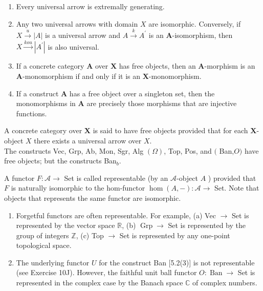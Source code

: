\begin{prop}
    \begin{enumerate}
        \item Every universal arrow is extremally generating.
        \item Any two universal arrows with domain $X$ are isomorphic. Conversely, if $X \xrightarrow{u}|A|$ is a universal arrow and $A \xrightarrow{k} A^{\prime}$ is an $\mathbf{A}$-isomorphism, then $X \xrightarrow{k o u}\left|A^{\prime}\right|$ is also universal.
        \item If a concrete category $\mathbf{A}$ over $\mathbf{X}$ has free objects, then an $\mathbf{A}$-morphism is an $\mathbf{A}$-monomorphism if and only if it is an $\mathbf{X}$-monomorphism.
        \item If a construct $\mathbf{A}$ has a free object over a singleton set, then the monomorphisms in $\mathbf{A}$ are precisely those morphisms that are injective functions.
    \end{enumerate}
\end{prop}

A concrete category over $\mathbf{X}$ is said to have free objects provided that for each $\mathbf{X}$-object $X$ there exists a universal arrow over $X$.\\
The constructs Vec, Grp, Ab, Mon, Sgr, Alg $(\Omega)$, Top, Pos, and $($ Ban,$O)$ have free objects; but the constructs Ban$_b$.

A functor $F: \mathcal{A} \rightarrow$ Set is called representable (by an $\mathcal{A}$-object $A$ ) provided that $F$ is naturally isomorphic to the hom-functor $\operatorname{hom}(A,-): \mathcal{A} \rightarrow$ Set. Note that objects that represents the same functor are isomorphic.

\begin{example}
    \begin{enumerate}
        \item Forgetful functors are often representable. For example,
        (a) Vec $\rightarrow$ Set is represented by the vector space $\mathbb{R}$,
        (b) $\operatorname{Grp} \rightarrow$ Set is represented by the group of integers $\mathbb{Z}$,
        (c) Top $\rightarrow$ Set is represented by any one-point topological space.
        \item The underlying functor $U$ for the construct Ban [5.2(3)] is not representable (see Exercise 10J). However, the faithful unit ball functor $O: \operatorname{Ban} \rightarrow$ Set is represented in the complex case by the Banach space $\mathbb{C}$ of complex numbers.
    \end{enumerate}
\end{example}

